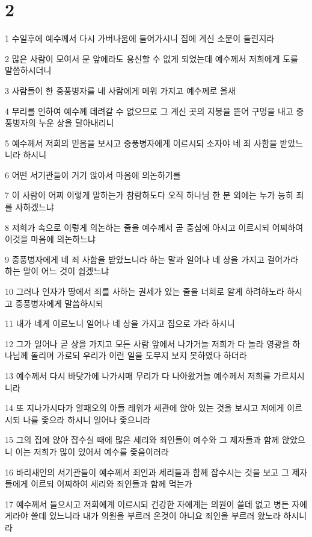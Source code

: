 \chapter{2}

\par 1 수일후에 예수께서 다시 가버나움에 들어가시니 집에 계신 소문이 들린지라
\par 2 많은 사람이 모여서 문 앞에라도 용신할 수 없게 되었는데 예수께서 저희에게 도를 말씀하시더니
\par 3 사람들이 한 중풍병자를 네 사람에게 메워 가지고 예수께로 올새
\par 4 무리를 인하여 예수께 데려갈 수 없으므로 그 계신 곳의 지붕을 뜯어 구멍을 내고 중풍병자의 누운 상을 달아내리니
\par 5 예수께서 저희의 믿음을 보시고 중풍병자에게 이르시되 소자야 네 죄 사함을 받았느니라 하시니
\par 6 어떤 서기관들이 거기 앉아서 마음에 의논하기를
\par 7 이 사람이 어찌 이렇게 말하는가 참람하도다 오직 하나님 한 분 외에는 누가 능히 죄를 사하겠느냐
\par 8 저희가 속으로 이렇게 의논하는 줄을 예수께서 곧 중심에 아시고 이르시되 어찌하여 이것을 마음에 의논하느냐
\par 9 중풍병자에게 네 죄 사함을 받았느니라 하는 말과 일어나 네 상을 가지고 걸어가라 하는 말이 어느 것이 쉽겠느냐
\par 10 그러나 인자가 땅에서 죄를 사하는 권세가 있는 줄을 너희로 알게 하려하노라 하시고 중풍병자에게 말씀하시되
\par 11 내가 네게 이르노니 일어나 네 상을 가지고 집으로 가라 하시니
\par 12 그가 일어나 곧 상을 가지고 모든 사람 앞에서 나가거늘 저희가 다 놀라 영광을 하나님께 돌리며 가로되 우리가 이런 일을 도무지 보지 못하였다 하더라
\par 13 예수께서 다시 바닷가에 나가시매 무리가 다 나아왔거늘 예수께서 저희를 가르치시니라
\par 14 또 지나가시다가 알패오의 아들 레위가 세관에 앉아 있는 것을 보시고 저에게 이르시되 나를 좇으라 하시니 일어나 좇으니라
\par 15 그의 집에 앉아 잡수실 때에 많은 세리와 죄인들이 예수와 그 제자들과 함께 앉았으니 이는 저희가 많이 있어서 예수를 좇음이러라
\par 16 바리새인의 서기관들이 예수께서 죄인과 세리들과 함께 잡수시는 것을 보고 그 제자들에게 이르되 어찌하여 세리와 죄인들과 함께 먹는가
\par 17 예수께서 들으시고 저희에게 이르시되 건강한 자에게는 의원이 쓸데 없고 병든 자에게라야 쓸데 있느니라 내가 의원을 부르러 온것이 아니요 죄인을 부르러 왔노라 하시니라
